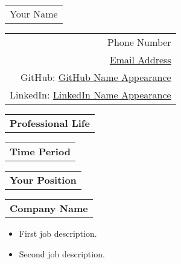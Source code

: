 \documentclass{article}
\begin{document}
  \begin{tcolorbox}
    {\fontsize{21}{11}\bfseries\begin{tabular}[c]{l}
      Your Name %
    \end{tabular}}\hfill
    {\small\begin{tabular}[c]{r}
      Phone Number \\ %
      \href{mailto: Email Address}{Email Address} \\ %
      GitHub: \href{GitHub url}{GitHub Name Appearance} \\ %
      LinkedIn: \href{LinkedIn url}{LinkedIn Name Appearance} \\ %
    \end{tabular}}
  \end{tcolorbox}

    \bigskip
    
    \begin{tabular}[c]{l}
      \textbf{Professional Life} \end{tabular} 
      \hline \hline \vspace{2pt}
      \begin{tabular}[c]{l} \textbf{Time Period} \end{tabular} \hfill
      \begin{tabular}[c]{c} \textbf{Your Position} \end{tabular} \hfill
      \begin{tabular}[c]{r} \textbf{Company Name} 
    \end{tabular}
    
   \begin{description}[style=nextline, listparindent=\parindent, parsep=0pt, \vspace{-1pt}]
    \begin{itemize}[, leftmargin=.01in]
        \item First job description.
        \item Second job description.
    \end{itemize}
   \end{description} \\

    \skip
    
\end{document}
